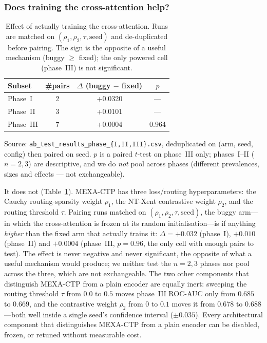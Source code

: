 \documentclass[a4paper,fleqn]{cas-sc}
\begin{document}
\subsubsection{Does training the cross-attention help?}
\begin{table}[t]
\centering
\small
\caption{Effect of actually training the cross-attention. Runs are matched on $(\rho_1,\rho_2,\tau,\text{seed})$ and de-duplicated before pairing. The sign is the opposite of a useful mechanism (buggy $\ge$ fixed); the only powered cell (phase~III) is not significant.}
\label{tab:ab}
\begin{tabular}{lccc}
\toprule
Subset & \#pairs & $\Delta$ (buggy $-$ fixed) & $p$ \\
\midrule
Phase~I & 2 & +0.0320 & --- \\
Phase~II & 3 & +0.0101 & --- \\
Phase~III & 7 & +0.0004 & 0.964 \\
\bottomrule
\end{tabular}
\begin{minipage}{\linewidth}\vspace{2pt}\scriptsize Source: \texttt{ab\_test\_results\_phase\_\{I,II,III\}.csv}, deduplicated on (arm, seed, config) then paired on seed. $p$ is a paired $t$-test on phase~III only; phases~I--II ($n{=}2,3$) are descriptive, and we do \emph{not} pool across phases (different prevalences, sizes and effects --- not exchangeable). \end{minipage}
\end{table}
It does not (Table~\ref{tab:ab}). MEXA-CTP has three loss/routing hyperparameters: the Cauchy
routing-sparsity weight $\rho_1$, the NT-Xent contrastive weight $\rho_2$, and the routing
threshold $\tau$. Pairing runs matched on $(\rho_1,\rho_2,\tau,\text{seed})$,
the buggy arm---in which the cross-attention is frozen at its random initialisation---is if
anything \emph{higher} than the fixed arm that actually trains it: $\Delta=+0.032$ (phase~I),
$+0.010$ (phase~II) and $+0.0004$ (phase~III, $p=0.96$, the only cell with enough pairs to
test). The effect is never negative and never significant, the opposite of what a useful
mechanism would produce; we neither test the $n{=}2,3$ phases nor pool across the three, which
are not exchangeable. The two other components that distinguish MEXA-CTP from a
plain encoder are equally inert: sweeping the routing threshold $\tau$ from $0.0$ to $0.5$
moves phase~III ROC-AUC only from $0.685$ to $0.669$, and the contrastive weight $\rho_2$
from $0$ to $0.1$ moves it from $0.678$ to $0.688$---both well inside a single seed's
confidence interval ($\pm0.035$). Every architectural component that distinguishes MEXA-CTP
from a plain encoder can be disabled, frozen, or retuned without measurable cost.
\end{document}
